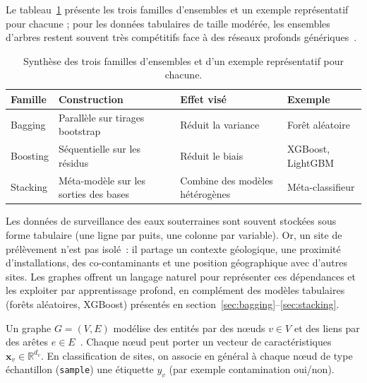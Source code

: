 Le tableau~\ref{tab:ensemble-comparaison} pr\'esente les trois familles d'ensembles et un exemple repr\'esentatif pour chacune ; pour les donn\'ees tabulaires de taille mod\'er\'ee, les ensembles d'arbres restent souvent tr\`es comp\'etitifs face \`a des r\'eseaux profonds g\'en\'eriques~\cite{borisov2024tabular}.

\begin{table}[h!]
    \centering
    \caption{Synth\`ese des trois familles d'ensembles et d'un exemple repr\'esentatif pour chacune.}
    \label{tab:ensemble-comparaison}
    \begin{tabular}{lp{3.2cm}p{3.2cm}p{3.5cm}}
        \hline
        Famille & Construction & Effet vis\'e & Exemple \\
        \hline
        Bagging & Parall\`ele sur tirages bootstrap & R\'eduit la variance & For\^et al\'eatoire \\
        Boosting & S\'equentielle sur les r\'esidus & R\'eduit le biais & XGBoost, LightGBM \\
        Stacking & M\'eta-mod\`ele sur les sorties des bases & Combine des mod\`eles h\'et\'erog\`enes & M\'eta-classifieur \\
        \hline
    \end{tabular}
\end{table}



\label{sec:graphes-gnn}

Les donn\'ees de surveillance des eaux souterraines sont souvent stock\'ees sous forme tabulaire (une ligne par puits, une colonne par variable).
Or, un site de pr\'el\`evement n'est pas isol\'e~: il partage un contexte g\'eologique, une proximit\'e d'installations, des co-contaminants et une position g\'eographique avec d'autres sites.
Les graphes offrent un langage naturel pour repr\'esenter ces d\'ependances et les exploiter par apprentissage profond, en compl\'ement des mod\`eles tabulaires (for\^ets al\'eatoires, XGBoost) pr\'esent\'es en section~\ref{sec:bagging}--\ref{sec:stacking}.

\label{sec:graphe-basics}

Un graphe $G = (V, E)$ mod\'elise des entit\'es par des n\oe uds $v \in V$ et des liens par des ar\^etes $e \in E$~\cite{hamilton2017inductive}.
Chaque n\oe ud peut porter un vecteur de caract\'eristiques $\mathbf{x}_v \in \mathbb{R}^{d_v}$.
En classification de sites, on associe en g\'en\'eral \`a chaque n\oe ud de type \og{}\'echantillon\fg{} (\texttt{sample}) une \'etiquette $y_v$ (par exemple contamination oui/non).

